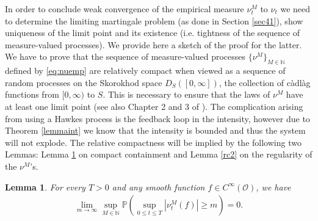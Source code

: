 \documentclass[10pt]{article}
\theoremstyle{plain}
\newtheorem{lemma}[theorem]{Lemma}                              %
\theoremstyle{definition}
\newcommand{\<}{\langle}
\renewcommand{\>}{\rangle}
\renewcommand{\(}{\left(}
\renewcommand{\)}{\right)}
\renewcommand{\[}{\left[}
\renewcommand{\]}{\right]}
\begin{document}
In order to conclude weak convergence of the empirical measure $\nu_t^M$ to $\nu_t$ we need to determine the limiting martingale problem (as done in Section \ref{sec41}), show uniqueness of the limit point and its existence (i.e. tightness of the sequence of measure-valued processes). We provide here a sketch of the proof for the latter. We have to prove that the sequence of measure-valued processes $\{\nu^M\}_{M\in\mathbb{N}}$ defined by \eqref{eq:nuemp} are relatively compact when viewed as a sequence of random processes on the Skorokhod space $D_S([0,\infty])$, the collection of c\`adl\`ag functions from $[0,\infty)$ to $S$. This is necessary to ensure that the laws of $\nu^M$ have at least one limit point  (see also Chapter 2 and 3 of \citet{ethier86}). The complication arising from using a Hawkes process is the feedback loop in the intensity, however due to Theorem \ref{lemmaint} we know that the intensity is bounded and thus the system will not explode. The relative compactness will be implied by the following two Lemmas: Lemma \ref{rc1} on compact containment and Lemma \ref{rc2} on the regularity of the $\nu^M$'s.
\begin{lemma}\label{rc1}
For every $T>0$ and any smooth function $f\in C^\infty(\mathcal{O})$, we have
\begin{align}
\lim_{m\to\infty}\sup\limits_{M\in\mathbb{N}}\mathbb{P}\left(\sup\limits_{0\leq t\leq
T}|\nu_t^M(f)|\geq m\right)=0.
\end{align}
\end{lemma}
\end{document}
